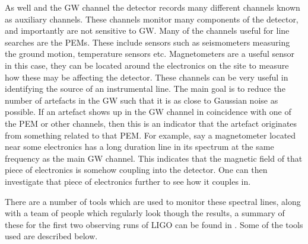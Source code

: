 %
As well and the \ac{GW} channel the detector records many different channels known as auxiliary channels. 
These channels monitor many components of the detector, and importantly are not sensitive to \ac{GW}.
Many of the channels useful for line searches are the \acp{PEM}.
These include sensors such as seismometers measuring the ground motion, temperature sensors etc. 
Magnetometers are a useful sensor in this case, they can be located around the electronics on the site to measure how these may be affecting the detector. 
These channels can be very useful in identifying the source of an instrumental line.
The main goal is to reduce the number of artefacts in the \ac{GW} such that it is as close to Gaussian noise as possible.
If an artefact shows up in the \ac{GW} channel in coincidence with one of the \ac{PEM} or other channels, then this is an indicator that the artefact originates from something related to that \ac{PEM}.
For example, say a magnetometer located near some electronics has a long duration line in its spectrum at the same frequency as the main \ac{GW} channel. 
This indicates that the magnetic field of that piece of electronics is somehow coupling into the detector. 
One can then investigate that piece of electronics further to see how it couples in.

%

There are a number of tools which are used to monitor these spectral lines, along with a team of people which regularly look though the results, a summary of these for the first two observing runs of \ac{LIGO} can be found in \citep{covas2018IdentificationMitigation}.
Some of the tools used are described below. 

